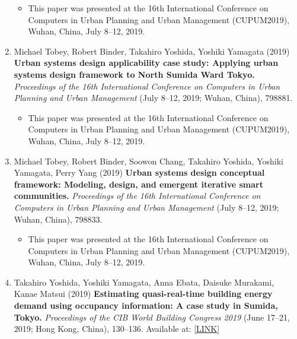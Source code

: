 \documentclass[]{book}
\providecommand{\tightlist}{%
  \setlength{\itemsep}{0pt}\setlength{\parskip}{0pt}}
\begin{document}
\begin{enumerate}
  \begin{itemize}
  \tightlist
  \item
    This paper was presented at the 16th International Conference on Computers in Urban Planning and Urban Management (CUPUM2019), Wuhan, China, July 8--12, 2019.
  \end{itemize}
\item
  Michael Tobey, Robert Binder, Takahiro Yoshida, Yoshiki Yamagata (2019)
  \textbf{Urban systems design applicability case study: Applying urban systems design framework to North Sumida Ward Tokyo.}
  \emph{Proceedings of the 16th International Conference on Computers in Urban Planning and Urban Management} (July 8--12, 2019; Wuhan, China), 798881.

  \begin{itemize}
  \tightlist
  \item
    This paper was presented at the 16th International Conference on Computers in Urban Planning and Urban Management (CUPUM2019), Wuhan, China, July 8--12, 2019.
  \end{itemize}
\item
  Michael Tobey, Robert Binder, Soowon Chang, Takahiro Yoshida, Yoshiki Yamagata, Perry Yang (2019)
  \textbf{Urban systems design conceptual framework: Modeling, design, and emergent iterative smart communities.}
  \emph{Proceedings of the 16th International Conference on Computers in Urban Planning and Urban Management} (July 8--12, 2019; Wuhan, China), 798833.

  \begin{itemize}
  \tightlist
  \item
    This paper was presented at the 16th International Conference on Computers in Urban Planning and Urban Management (CUPUM2019), Wuhan, China, July 8--12, 2019.
  \end{itemize}
\item
  Takahiro Yoshida, Yoshiki Yamagata, Anna Ebata, Daisuke Murakami, Kanae Matsui (2019)
  \textbf{Estimating quasi-real-time building energy demand using occupancy information: A case study in Sumida, Tokyo.}
  \emph{Proceedings of the CIB World Building Congress 2019} (June 17--21, 2019; Hong Kong, China), 130--136.
  Available at: {[}\href{https://site.cibworld.nl/dl/publications/WBC19/WBC_Proceedings_June2019_Complete.pdf}{LINK}{]}


\end{enumerate}
\end{document}
